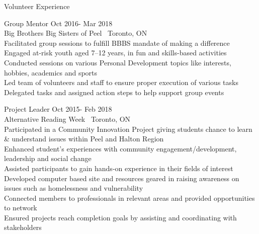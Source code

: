 \documentclass{article}
\begin{document}
\begin{center}
  \large  \textcolor{ablue}{Volunteer Experience}
\end{center}

\noindent Group Mentor                   
\hfill Oct 2016- Mar 2018
\\Big Brothers Big Sisters of Peel   \textbar \ Toronto, ON        
\\Facilitated group sessions to fulfill BBBS mandate of making a difference
\\Engaged at-risk youth aged 7–12 years, in fun and skills-based activities
\\Conducted sessions on various Personal Development topics like interests, hobbies, academics and  sports
\\Led team of volunteers and staff to ensure proper execution of various tasks
\\Delegated tasks and assigned action steps to help support group events 

\bigskip

\noindent Project Leader                                                                                                                                 
\hfill Oct 2015- Feb 2018
\\Alternative Reading Week \textbar \ Toronto, ON                                                                 
\\Participated in a Community Innovation Project giving students chance to learn \& understand issues within Peel and Halton Region
\\Enhanced student’s experiences with community engagement/development, leadership and social change
\\Assisted participants to gain hands-on experience in their fields of interest
\\Developed computer based site and resources geared in raising awareness on issues such as homelessness and vulnerability
\\Connected members to professionals in relevant areas and provided opportunities to network
\\Ensured projects reach completion goals by assisting and coordinating with stakeholders
\end{document}
